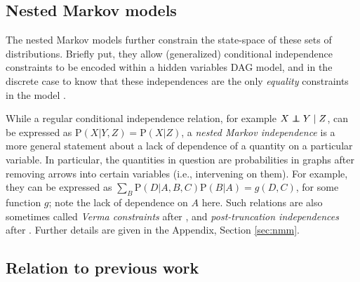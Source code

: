 \documentclass[12pt]{article}
\newcommand\indep{\protect\mathpalette{\protect\independenT}{\perp}}
\def\independenT#1#2{\mathrel{\rlap{$#1#2$}\mkern2mu{#1#2}}}
\def\Pr{{\mathrm{P}}}
\DeclareMathOperator{\Anobs}{Anobs}
\DeclareMathOperator{\Paobs}{Paobs}
\newcommand{\bW}{\boldsymbol{W}}
\DeclareMathOperator{\Do}{do}
\begin{document}



\subsection{Nested Markov models} \label{sec:nested}

The nested Markov models \citep{richardson2023nested} further constrain the state-space of these sets of distributions. Briefly put, they allow (generalized) conditional independence constraints to be encoded within a hidden variables DAG model, and in the discrete case to know that these independences are the only \emph{equality} constraints in the model \citep{evans2018margins}. 


While a regular conditional independence relation, for example $X \indep Y \mid Z$, can be expressed as $\Pr(X | Y, Z) = \Pr(X | Z)$, a \emph{nested Markov independence} is a more general statement about a lack of dependence of a quantity on a particular variable. In particular, the quantities in question are probabilities in graphs after removing arrows into certain variables (i.e., intervening on them). For example, they can be expressed as $\sum_B \Pr(D | A, B, C)\Pr(B | A) = g(D, C)$, for some function $g$; note the lack of dependence on $A$ here. Such relations are also sometimes called \emph{Verma constraints} after \citet{verma2022equivalence}, and \emph{post-truncation independences} after \citet{shpitser2012parameter}.
Further details are given in the Appendix, Section \ref{sec:nmm}.

\subsection{Relation to previous work}
\end{document}
